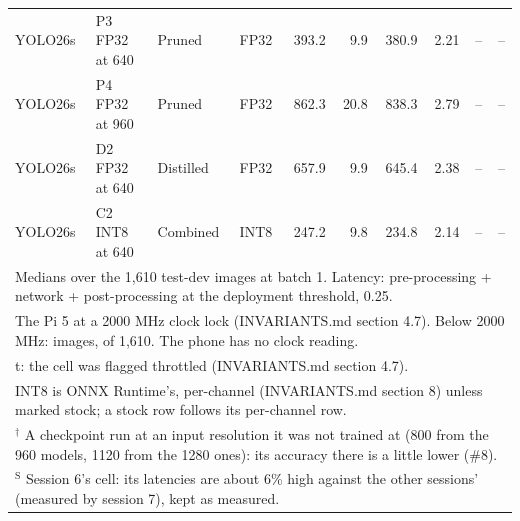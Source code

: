\begin{longtable}{llllrrrrrr}
YOLO26s & P3 FP32 at 640 & Pruned & FP32 & 393.2 & 9.9 & 380.9 & 2.21 & -- & -- \\
YOLO26s & P4 FP32 at 960 & Pruned & FP32 & 862.3 & 20.8 & 838.3 & 2.79 & -- & -- \\
YOLO26s & D2 FP32 at 640 & Distilled & FP32 & 657.9 & 9.9 & 645.4 & 2.38 & -- & -- \\
YOLO26s & C2 INT8 at 640 & Combined & INT8 & 247.2 & 9.8 & 234.8 & 2.14 & -- & -- \\
\bottomrule
\multicolumn{10}{l}{\footnotesize Medians over the 1,610 test-dev images at batch 1. Latency: pre-processing + network + post-processing at the deployment threshold, 0.25.} \\
\multicolumn{10}{l}{\footnotesize The Pi 5 at a 2000 MHz clock lock (INVARIANTS.md section 4.7). Below 2000 MHz: images, of 1,610. The phone has no clock reading.} \\
\multicolumn{10}{l}{\footnotesize t: the cell was flagged throttled (INVARIANTS.md section 4.7).} \\
\multicolumn{10}{l}{\footnotesize INT8 is ONNX Runtime's, per-channel (INVARIANTS.md section 8) unless marked stock; a stock row follows its per-channel row.} \\
\multicolumn{10}{l}{\footnotesize $^{\dagger}$ A checkpoint run at an input resolution it was not trained at (800 from the 960 models, 1120 from the 1280 ones): its accuracy there is a little lower (\#8).} \\
\multicolumn{10}{l}{\footnotesize $^{\mathrm{S}}$ Session 6's cell: its latencies are about 6\% high against the other sessions' (measured by session 7), kept as measured.} \\
\end{longtable}
